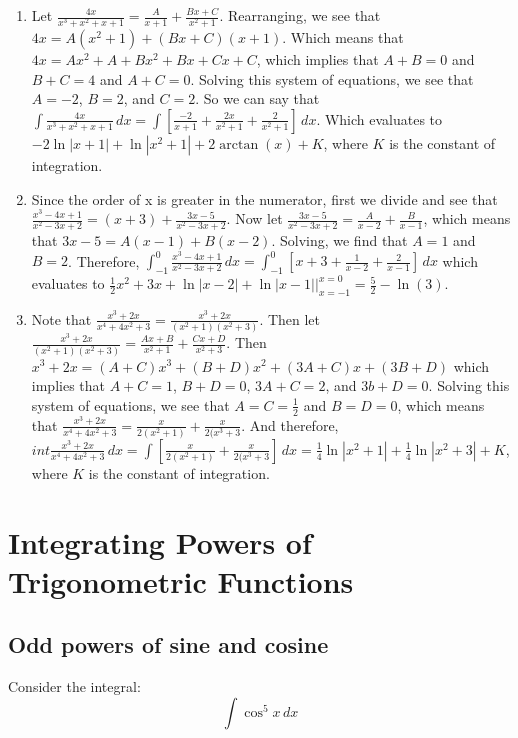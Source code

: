 \begin{Answer}[ref=partfrac]
\begin{enumerate}
\item Let $\frac{4x}{x^3 + x^2 + x + 1} = \frac{A}{x + 1} + \frac{Bx + C}{x^2 
+ 1}$. Rearranging, we see that $4x = A(x^2 + 1) + (Bx + C)(x + 1)$. Which 
means that $4x = Ax^2 + A + Bx^2 + Bx + Cx + C$, which implies that $A + B = 
0$ and $B + C = 4$ and $A + C = 0$. Solving this system of equations, we see 
that $A = -2$, $B = 2$, and $C = 2$. So we can say that $\int \frac{4x}{x^3 + 
x^2 + x + 1}\,dx = \int \left[ \frac{-2}{x + 1} + \frac{2x}{x^2 + 1} + \frac{2
}{x^2 + 1} \right]\,dx$. Which evaluates to $-2\ln{|x + 1|} + \ln{|x^2 + 1|} 
+ 2\arctan{(x)} + K$, where $K$ is the constant of integration.  
\item Since the order of x is greater in the numerator, first we divide and 
see that $\frac{x^3 - 4x + 1}{x^2 - 3x + 2} = (x + 3) + \frac{3x - 5}{x^2 - 3x 
+ 2}$. Now let $\frac{3x-5}{x^2 - 3x + 2} = \frac{A}{x-2} + \frac{B}{x - 1}$, 
which means that $3x - 5 = A(x - 1) + B(x - 2)$. Solving, we find that $A = 1$ 
and $B = 2$. Therefore, $\int_{-1}^0 \frac{x^3 - 4x + 1}{x^2 - 3x + 2}\,dx = 
\int_{-1}^0 \left[ x + 3 + \frac{1}{x-2} + \frac{2}{x-1} \right]\,dx$ which 
evaluates to $\frac{1}{2}x^2 + 3x + \ln{|x - 2|} + \ln{|x - 1|}|_{x = -1}^{x = 
0} = \frac{5}{2} - \ln{(3)}$. 
\item Note that $\frac{x^3 + 2x}{x^4 + 4x^2 + 3} = \frac{x^3 + 2x}{(x^2 + 1)(x^
2 + 3)}$. Then let $\frac{x^3 + 2x}{(x^2 + 1)(x^2 + 3)} = \frac{Ax + B}{x^2 + 1
} + \frac{Cx + D}{x^2 + 3}$. Then $x^3 + 2x = (A + C)x^3 + (B + D)x^2 + (3A + C
)x + (3B + D)$ which implies that $A + C = 1$, $B + D = 0$, $3A + C = 2$, and $
3b + D = 0$. Solving this system of equations, we see that $A = C = \frac{1}{2}
$ and $B = D = 0$, which means that $\frac{x^3 + 2x}{x^4 + 4x^2 + 3} = \frac{x
}{2(x^2 + 1)} + \frac{x}{2(x^3 + 3}$. And therefore, $int \frac{x^3 + 2x}{x^4 
+ 4x^2 + 3}\,dx = \int \left[ \frac{x}{2(x^2 + 1)} + \frac{x}{2(x^3 + 3} 
\right]\,dx = \frac{1}{4}\ln{|x^2 + 1|} + \frac{1}{4}\ln{|x^2 + 3|} + K$, 
where $K$ is the constant of integration. 
\end{enumerate}
\end{Answer}

\section{Integrating Powers of Trigonometric Functions}
\subsection{Odd powers of sine and cosine}
Consider the integral:
$$\int \cos^5{x}\,dx$$

